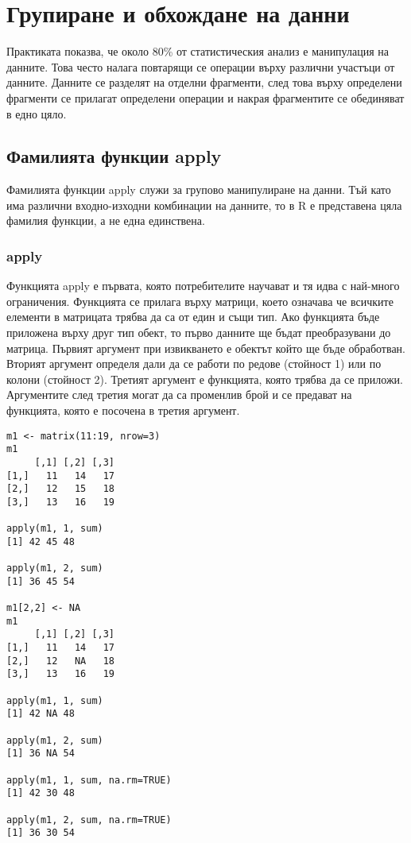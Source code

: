 \newpage
\chapter{Групиране и обхождане на данни}
\label{chapter06}

Практиката показва, че около 80\% от статистическия анализ е манипулация на данните. Това често налага повтарящи се операции върху различни участъци от данните. Данните се разделят на отделни фрагменти, след това върху определени фрагменти се прилагат определени операции и накрая фрагментите се обединяват в едно цяло. 

\section{Фамилията функции apply}

Фамилията функции apply служи за групово манипулиране на данни. Тъй като има различни входно-изходни комбинации на данните, то в R е представена цяла фамилия функции, а не една единствена.

\subsection{apply}

Функцията apply е първата, която потребителите научават и тя идва с най-много ограничения. Функцията се прилага върху матрици, което означава че всичките елементи в матрицата трябва да са от един и същи тип. Ако функцията бъде приложена върху друг тип обект, то първо данните ще бъдат преобразувани до матрица. Първият аргумент при извикването е обектът който ще бъде обработван. Вторият аргумент определя дали да се работи по редове (стойност 1) или по колони (стойност 2). Третият аргумент е функцията, която трябва да се приложи. Аргументите след третия могат да са променлив брой и се предават на функцията, която е посочена в третия аргумент. 

\begin{lstlisting}[caption=Сума по редове и колони, label=listing0093]
m1 <- matrix(11:19, nrow=3)
m1
     [,1] [,2] [,3]
[1,]   11   14   17
[2,]   12   15   18
[3,]   13   16   19
 
apply(m1, 1, sum)
[1] 42 45 48
 
apply(m1, 2, sum)
[1] 36 45 54

m1[2,2] <- NA
m1
     [,1] [,2] [,3]
[1,]   11   14   17
[2,]   12   NA   18
[3,]   13   16   19

apply(m1, 1, sum)
[1] 42 NA 48

apply(m1, 2, sum)
[1] 36 NA 54

apply(m1, 1, sum, na.rm=TRUE)
[1] 42 30 48

apply(m1, 2, sum, na.rm=TRUE)
[1] 36 30 54
\end{lstlisting}

